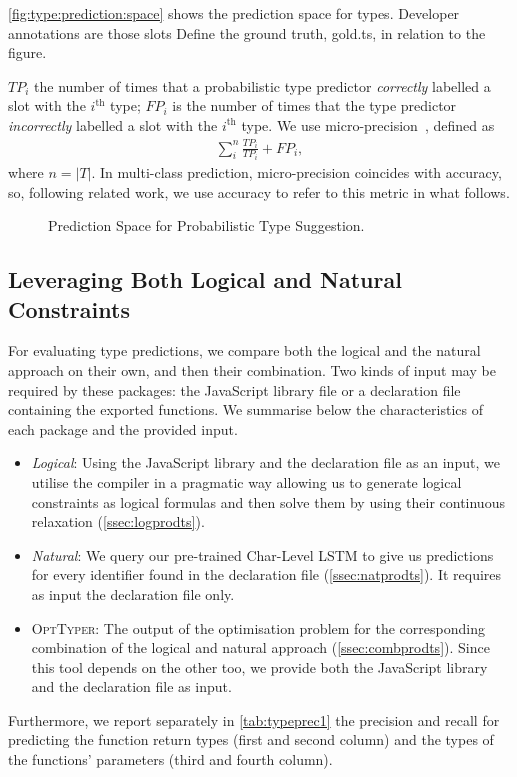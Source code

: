 \documentclass[acmsmall, review, anonymous]{acmart}\settopmatter{printfolios=true,printccs=false,printacmref=false}
\newcommand{\projectname}{\textsc{OptTyper}\xspace}
\begin{document}
\autoref{fig:type:prediction:space} shows the prediction space for types.
Developer annotations are those slots 
Define the ground truth, gold.ts, in relation to the figure.

$TP_i$ the number of times that a probabilistic type predictor \emph{correctly} labelled a slot with the $i^\text{th}$ type;  $FP_i$ is the number of times that the type predictor \emph{incorrectly} labelled a slot with the $i^\text{th}$ type.
We use micro-precision~\cite{manning}, defined as 
%
\begin{align}\label{eq:acc}
    \sum_i^n \frac{TP_i}{TP_i} + FP_i,
\end{align}
%
where $n=|T|$. In multi-class prediction, micro-precision coincides with accuracy, so, following related work, we use accuracy to refer to this metric in what follows.

\begin{figure*}[t]
    \centering
    \def\svgwidth{0.8\linewidth}
    
    \caption{Prediction Space for Probabilistic Type Suggestion.}
    \label{fig:type:prediction:space}
\end{figure*}


\subsection{Leveraging Both Logical and Natural Constraints}

For evaluating type predictions,
we compare both the logical and the natural approach on their own,
and then their combination.
Two kinds of input may be required by these packages:
the JavaScript library file or a declaration file containing the exported functions.
We summarise below the characteristics of each package and the provided input.
\begin{itemize}[label={\tiny$\bullet$}]
	\item \textit{Logical}: Using the JavaScript library and the declaration file as an input,
	      we utilise the compiler in a pragmatic way allowing us to generate logical constraints as logical formulas
	      and then solve them by using their continuous relaxation (\cref{ssec:logprodts}).
	\item \textit{Natural}: We query our pre-trained Char-Level LSTM to give us predictions for every identifier
	      found in the declaration file (\cref{ssec:natprodts}).
	      It requires as input the declaration file only.
	\item \projectname: The output of the optimisation problem for the corresponding combination of the logical
	      and natural approach (\cref{ssec:combprodts}).
	      Since this tool depends on the other too, we provide both the JavaScript library
	      and the declaration file as input.
\end{itemize}
Furthermore, we report separately in \cref{tab:typeprec1} the precision and recall for predicting the function return types (first and second column) and the types of the functions' parameters (third and fourth column).
\end{document}
